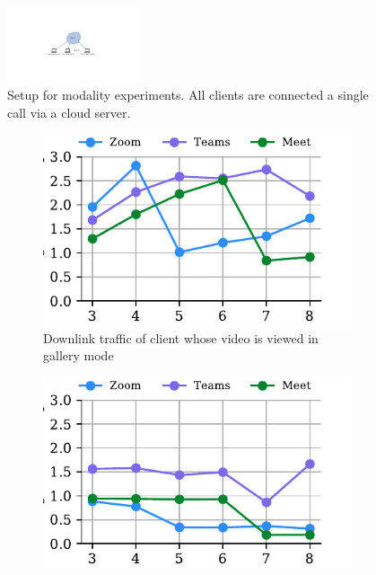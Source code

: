 \begin{figure}[h]
\centering
    \includegraphics[width=0.35\textwidth,keepaspectratio]{../figures/methodology/modality-setup.pdf}
    \caption{Setup for modality experiments. All clients are connected a single call via a cloud server.}
    \label{fig:modality-setup}
\end{figure}

\begin{figure}[ht]
\begin{subfigure}[t]{.33\textwidth}
  \centering
   \captionsetup{width=.9\linewidth}
    \includegraphics[width=1\textwidth,keepaspectratio]{../figures/modality/gallery_recv.pdf}
    \caption{Downlink traffic of client whose video is viewed in gallery mode}
    \label{fig:gallery-recv}
\end{subfigure}
\hfill
\begin{subfigure}[t]{.33\textwidth}
  \centering
   \captionsetup{width=.9\linewidth}
    \includegraphics[width=1\textwidth,keepaspectratio]{../figures/modality/gallery_send.pdf}

\end{subfigure}
\end{figure}
